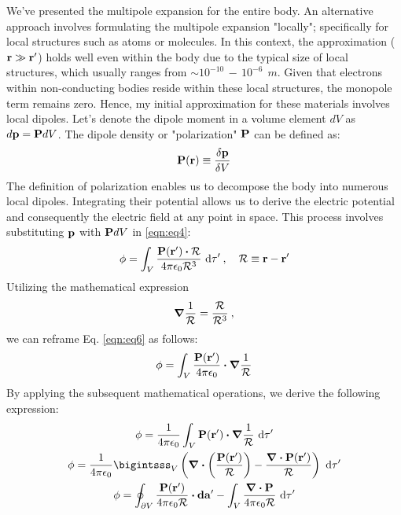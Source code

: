 \documentclass{article}
\numberwithin{equation}{section}
\begin{document}
\par 
We've presented the multipole expansion for the entire body. An alternative approach involves formulating the multipole expansion "locally"; specifically for local structures such as atoms or molecules. In this context, the approximation ($\vb{r}\gg \vb{r'}$) holds well even within the body due to the typical size of local structures, which usually ranges from $\sim 10^{-10}\,-\,10^{-6}\:\:m$. Given that electrons within non-conducting bodies reside within these local structures, the monopole term remains zero. Hence, my initial approximation for these materials involves local dipoles. Let's denote the dipole moment in a volume element $dV$ as $d\vb{p}=\vb{P}dV$. The dipole density or "polarization" $\vb{P}$ can be defined as:
\begin{equation}
    \vb{P}(\vb{r})\equiv \fdv{\vb{p}}{V}    \label{eqn:eq5}
\end{equation}
The definition of polarization enables us to decompose the body into numerous local dipoles. Integrating their potential allows us to derive the electric potential and consequently the electric field at any point in space. This process involves substituting $\vb{p}$ with $\vb{P}dV$ in \eqref{eqn:eq4}:
%
\begin{equation}
    \phi=\int_V \frac{\vb{P}(\vb{r'})\vdot\vb{\mathcal{R}}}{4\pi\epsilon_0 \mathcal{R}^3} \ \dd\tau'\:,    \quad   \vb{\mathcal{R}}\equiv\vb{r}-\vb{r'}    \label{eqn:eq6}
\end{equation}
%
Utilizing the mathematical expression
\begin{equation}
    \grad \frac{1}{\mathcal{R}}=\frac{\vb{\mathcal{R}}}{\mathcal{R}^3}\:,    \label{eqn:eq7}
\end{equation}
%
we can reframe Eq. \eqref{eqn:eq6} as follows:
%
\begin{equation}
    \phi=\int_V \frac{\vb{P}(\vb{r'})}{4\pi\epsilon_0} \vdot \grad\frac{1}{\mathcal{R}}    \label{eqn:eq8}
\end{equation}
%
By applying the subsequent mathematical operations, we derive the following expression:
%
\begin{gather}
    \phi=\frac{1}{4\pi\epsilon_0}\int_V \vb{P}(\vb{r'})\vdot\grad\frac{1}{\mathcal{R}}\ \dd\tau' \nonumber \\ \phi=\frac{1}{4\pi\epsilon_0} \bigintsss_V \left(\div(\frac{\vb{P}(\vb{r'})}{\mathcal{R}})-\frac{\div\vb{P}(\vb{r'})}{\mathcal{R}}\right)\ \dd\tau'\nonumber\\\phi=\oint_{\partial V} \frac{\vb{P}(\vb{r'})}{4\pi\epsilon_0 \mathcal{R}}\vdot \vb{da'} - \int_V \frac{\div\vb{P}}{4\pi\epsilon_0 \mathcal{R}} \ \dd\tau' \label{eqn:eq9}
\end{gather}
\end{document}
